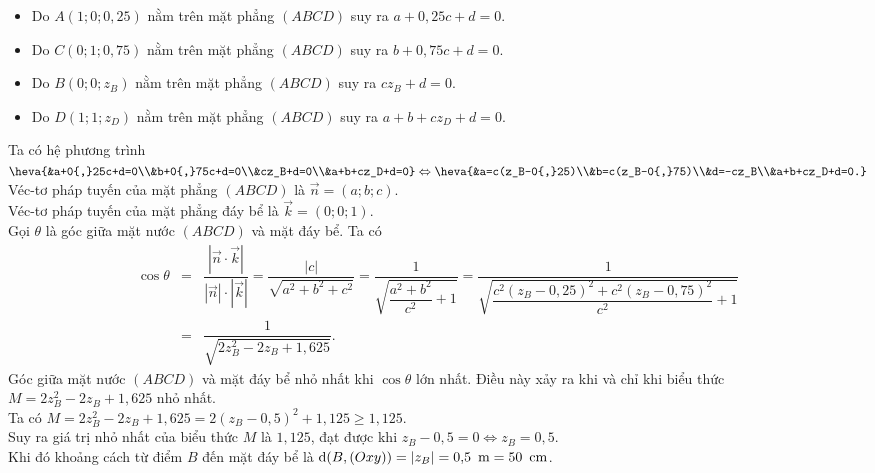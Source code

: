 \begin{bt}
{		\begin{itemize}
			\item Do $A(1;0;0{,}25)$ nằm trên mặt  phẳng $(ABCD)$ suy ra $a+0{,}25c+d=0$.
			\item Do $C(0;1;0{,}75)$ nằm trên mặt phẳng $(ABCD)$ suy  ra $b+0{,}75c+d=0$.
			 \item Do $B(0;0;z_B)$ nằm trên mặt phẳng $(ABCD)$ suy ra $cz_B+d=0$.
			\item  Do $D(1;1;z_D)$ nằm trên mặt phẳng $(ABCD)$ suy ra $a+b+cz_D+d=0$.
		\end{itemize}
		Ta có hệ phương  trình
		$\heva{&a+0{,}25c+d=0\\&b+0{,}75c+d=0\\&cz_B+d=0\\&a+b+cz_D+d=0}\Leftrightarrow \heva{&a=c(z_B-0{,}25)\\&b=c(z_B-0{,}75)\\&d=-cz_B\\&a+b+cz_D+d=0.}$\\ 
		Véc-tơ pháp tuyến của mặt  phẳng $(ABCD)$ là $\overrightarrow{n}=(a;b;c)$.\\
		Véc-tơ pháp tuyến  của mặt phẳng đáy bể là $\overrightarrow{k}=(0;0;1)$.\\
		Gọi $\theta$ là góc giữa mặt nước $(ABCD)$ và mặt đáy bể. Ta  có
		\begin{eqnarray*}
			\cos  \theta&=&\dfrac{|\overrightarrow{n} \cdot \overrightarrow{k}|}{|\overrightarrow{n}|\cdot |\overrightarrow{k}|}=\dfrac{|c|}{\sqrt{a^2+b^2+c^2}}=\dfrac{1}{\sqrt{\dfrac{a^2+b^2}{c^2}+1}}=\dfrac{1}{\sqrt{\dfrac{c^2(z_B-0{,}25)^2+c^2(z_B-0{,}75)^2}{c^2}+1}}\\
			&=&\dfrac{1}{\sqrt{2z_B^2-2z_B+1{,}625}}. 
		\end{eqnarray*}
		Góc giữa mặt nước $(ABCD)$ và mặt đáy bể nhỏ nhất khi $\cos \theta$ lớn nhất. Điều này xảy ra khi và chỉ khi  biểu thức $M=2z_B^2-2z_B+1{,}625$ nhỏ nhất.\\
		Ta có $M=2z_B^2-2z_B+1{,}625=2(z_B-0{,}5)^2+1{,}125 \geq  1{,}125$.\\
		Suy ra giá trị nhỏ  nhất của biểu thức $M$ là $1{,}125$, đạt được khi $z_B-0{,}5=0\Leftrightarrow z_B=0{,}5$.\\
		Khi đó khoảng cách từ điểm $B$ đến mặt đáy bể là $\mathrm{d}(B,(Oxy))=|z_B|=0{,}5\text{ \,m}=50\text{ \,cm}$. 
	} 
\end{bt}


